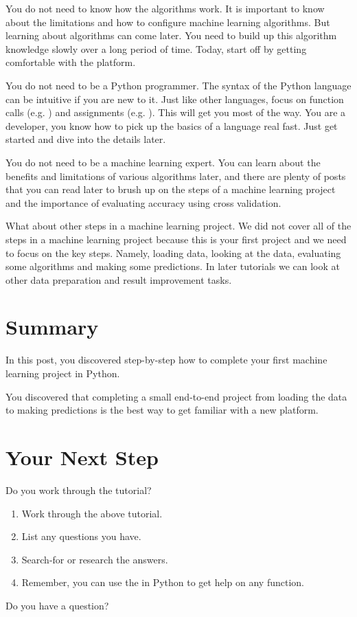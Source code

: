 You do not need to know how the algorithms work. It is important to know about the limitations and how to configure machine learning algorithms. But learning about algorithms can come later. You need to build up this algorithm knowledge slowly over a long period of time. Today, start off by getting comfortable with the platform.
     
You do not need to be a Python programmer. The syntax of the Python language can be intuitive if you are new to it. Just like other languages, focus on function calls (e.g. ) and assignments (e.g. ). This will get you most of the way. You are a developer, you know how to pick up the basics of a language real fast. Just get started and dive into the details later.
     
You do not need to be a machine learning expert. You can learn about the benefits and limitations of various algorithms later, and there are plenty of posts that you can read later to brush up on the steps of a machine learning project and the importance of evaluating accuracy using cross validation.
     
What about other steps in a machine learning project. We did not cover all of the steps in a machine learning project because this is your first project and we need to focus on the key steps. Namely, loading data, looking at the data, evaluating some algorithms and making some predictions. In later tutorials we can look at other data preparation and result improvement tasks.
     
\section{Summary}

In this post, you discovered step-by-step how to complete your first machine learning project in Python.
    
You discovered that completing a small end-to-end project from loading the data to making predictions is the best way to get familiar with a new platform.
    
\section{Your Next Step}

Do you work through the tutorial?

\begin{enumerate}
  \item Work through the above tutorial.
  \item List any questions you have.
  \item Search-for or research the answers.
  \item Remember, you can use the  in Python to get help on any function.
\end{enumerate}
  
Do you have a question?
